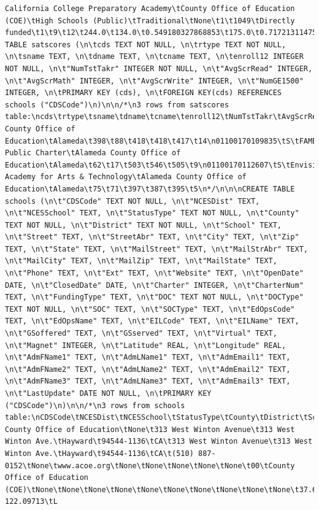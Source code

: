 \documentclass[
  letterpaper,
  DIV=11,
  numbers=noendperiod]{scrartcl}
\begin{document}
\begin{verbatim}
California College Preparatory Academy\tCounty Office of Education (COE)\tHigh Schools (Public)\tTraditional\tNone\t1\t1049\tDirectly funded\t1\t9\t12\t244.0\t134.0\t0.549180327868853\t175.0\t0.717213114754098\t230.0\t128.0\t0.556521739130435\t168.0\t0.730434782608696\t1\n*/\n\n\nCREATE TABLE satscores (\n\tcds TEXT NOT NULL, \n\trtype TEXT NOT NULL, \n\tsname TEXT, \n\tdname TEXT, \n\tcname TEXT, \n\tenroll12 INTEGER NOT NULL, \n\t"NumTstTakr" INTEGER NOT NULL, \n\t"AvgScrRead" INTEGER, \n\t"AvgScrMath" INTEGER, \n\t"AvgScrWrite" INTEGER, \n\t"NumGE1500" INTEGER, \n\tPRIMARY KEY (cds), \n\tFOREIGN KEY(cds) REFERENCES schools ("CDSCode")\n)\n\n/*\n3 rows from satscores table:\ncds\trtype\tsname\tdname\tcname\tenroll12\tNumTstTakr\tAvgScrRead\tAvgScrMath\tAvgScrWrite\tNumGE1500\n01100170000000\tD\tNone\tAlameda County Office of Education\tAlameda\t398\t88\t418\t418\t417\t14\n01100170109835\tS\tFAME Public Charter\tAlameda County Office of Education\tAlameda\t62\t17\t503\t546\t505\t9\n01100170112607\tS\tEnvision Academy for Arts & Technology\tAlameda County Office of Education\tAlameda\t75\t71\t397\t387\t395\t5\n*/\n\n\nCREATE TABLE schools (\n\t"CDSCode" TEXT NOT NULL, \n\t"NCESDist" TEXT, \n\t"NCESSchool" TEXT, \n\t"StatusType" TEXT NOT NULL, \n\t"County" TEXT NOT NULL, \n\t"District" TEXT NOT NULL, \n\t"School" TEXT, \n\t"Street" TEXT, \n\t"StreetAbr" TEXT, \n\t"City" TEXT, \n\t"Zip" TEXT, \n\t"State" TEXT, \n\t"MailStreet" TEXT, \n\t"MailStrAbr" TEXT, \n\t"MailCity" TEXT, \n\t"MailZip" TEXT, \n\t"MailState" TEXT, \n\t"Phone" TEXT, \n\t"Ext" TEXT, \n\t"Website" TEXT, \n\t"OpenDate" DATE, \n\t"ClosedDate" DATE, \n\t"Charter" INTEGER, \n\t"CharterNum" TEXT, \n\t"FundingType" TEXT, \n\t"DOC" TEXT NOT NULL, \n\t"DOCType" TEXT NOT NULL, \n\t"SOC" TEXT, \n\t"SOCType" TEXT, \n\t"EdOpsCode" TEXT, \n\t"EdOpsName" TEXT, \n\t"EILCode" TEXT, \n\t"EILName" TEXT, \n\t"GSoffered" TEXT, \n\t"GSserved" TEXT, \n\t"Virtual" TEXT, \n\t"Magnet" INTEGER, \n\t"Latitude" REAL, \n\t"Longitude" REAL, \n\t"AdmFName1" TEXT, \n\t"AdmLName1" TEXT, \n\t"AdmEmail1" TEXT, \n\t"AdmFName2" TEXT, \n\t"AdmLName2" TEXT, \n\t"AdmEmail2" TEXT, \n\t"AdmFName3" TEXT, \n\t"AdmLName3" TEXT, \n\t"AdmEmail3" TEXT, \n\t"LastUpdate" DATE NOT NULL, \n\tPRIMARY KEY ("CDSCode")\n)\n\n/*\n3 rows from schools table:\nCDSCode\tNCESDist\tNCESSchool\tStatusType\tCounty\tDistrict\tSchool\tStreet\tStreetAbr\tCity\tZip\tState\tMailStreet\tMailStrAbr\tMailCity\tMailZip\tMailState\tPhone\tExt\tWebsite\tOpenDate\tClosedDate\tCharter\tCharterNum\tFundingType\tDOC\tDOCType\tSOC\tSOCType\tEdOpsCode\tEdOpsName\tEILCode\tEILName\tGSoffered\tGSserved\tVirtual\tMagnet\tLatitude\tLongitude\tAdmFName1\tAdmLName1\tAdmEmail1\tAdmFName2\tAdmLName2\tAdmEmail2\tAdmFName3\tAdmLName3\tAdmEmail3\tLastUpdate\n01100170000000\t0691051\tNone\tActive\tAlameda\tAlameda County Office of Education\tNone\t313 West Winton Avenue\t313 West Winton Ave.\tHayward\t94544-1136\tCA\t313 West Winton Avenue\t313 West Winton Ave.\tHayward\t94544-1136\tCA\t(510) 887-0152\tNone\twww.acoe.org\tNone\tNone\tNone\tNone\tNone\t00\tCounty Office of Education (COE)\tNone\tNone\tNone\tNone\tNone\tNone\tNone\tNone\tNone\tNone\t37.658212\t-122.09713\tL 
\end{verbatim}
\end{document}
